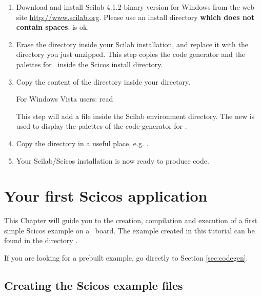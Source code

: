 \begin{enumerate}
\item Download and install Scilab 4.1.2 binary version for Windows from
  the web site \url{http://www.scilab.org}. Please use an install
  directory {\bf which does not contain spaces}:
   is ok.
\item Erase the  directory inside your Scilab
  installation, and replace it with the 
  directory you just unzipped. This step copies the code generator and
  the palettes for \flex\ inside the Scicos install directory.
\item Copy the content of the  directory inside your
   directory. 
  \begin{warning}
  For Windows Vista users: read 
  \end{warning}
  This step will
  add a  file inside the Scilab environment
  directory. The new  is used to display the palettes
  of the code generator for \flex.

\item Copy the  directory in a useful place,
  e.g. .
\item Your Scilab/Scicos installation is now ready to produce code.
\end{enumerate}

\chapter{Your first Scicos application}
\label{ch:firstexample}

This Chapter will guide you to the creation, compilation and execution
of a first simple Scicos example on a \flex\ board. The example
created in this tutorial can be found in the directory
.

If you are looking for a prebuilt example, go directly to Section
\ref{sec:codegen}.

\section{Creating the Scicos example files}

